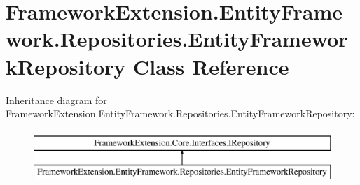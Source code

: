 \hypertarget{class_framework_extension_1_1_entity_framework_1_1_repositories_1_1_entity_framework_repository}{\section{Framework\-Extension.\-Entity\-Framework.\-Repositories.\-Entity\-Framework\-Repository Class Reference}
\label{class_framework_extension_1_1_entity_framework_1_1_repositories_1_1_entity_framework_repository}
}
Inheritance diagram for Framework\-Extension.\-Entity\-Framework.\-Repositories.\-Entity\-Framework\-Repository\-:\begin{figure}[H]
\begin{center}
\leavevmode
\includegraphics[height=2.000000cm]{class_framework_extension_1_1_entity_framework_1_1_repositories_1_1_entity_framework_repository}
\end{center}
\end{figure}

